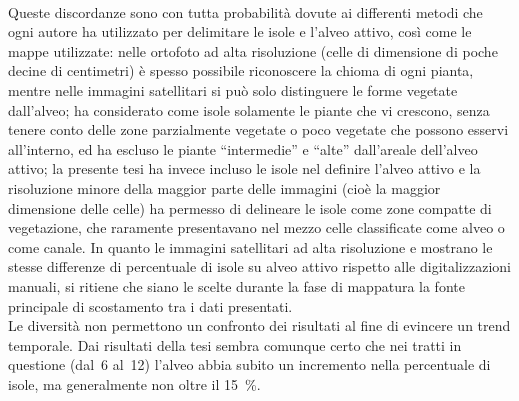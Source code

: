 \\
Queste discordanze sono con tutta probabilità dovute ai differenti metodi che ogni autore ha utilizzato per delimitare le isole e l'alveo attivo, così come le mappe utilizzate:
nelle ortofoto ad alta risoluzione (celle di dimensione di poche decine di centimetri) è spesso possibile riconoscere la chioma di ogni pianta, mentre nelle immagini satellitari si può solo distinguere le forme vegetate dall'alveo;
 ha considerato come isole solamente le piante che vi crescono, senza tenere conto delle zone parzialmente vegetate o poco vegetate che possono esservi all'interno, ed ha escluso le piante “intermedie” e “alte” dall'areale dell'alveo attivo;
la presente tesi ha invece incluso le isole nel definire l'alveo attivo e la risoluzione minore della maggior parte delle immagini (cioè la maggior dimensione delle celle) ha permesso di delineare le isole come zone compatte di vegetazione, che raramente presentavano nel mezzo celle classificate come alveo o come canale.
In quanto le immagini satellitari ad alta risoluzione \Pl{} e \WV{} mostrano le stesse differenze di percentuale di isole su alveo attivo rispetto alle digitalizzazioni manuali, si ritiene che siano le scelte durante la fase di mappatura la fonte principale di scostamento tra i dati presentati.
\\
Le diversità non permettono un confronto dei risultati al fine di evincere un trend temporale.
Dai risultati della tesi sembra comunque certo che nei tratti in questione (dal~6 al~12) l'alveo abbia subito un incremento nella percentuale di isole, ma generalmente non oltre il \SI{15}{\percent}.

